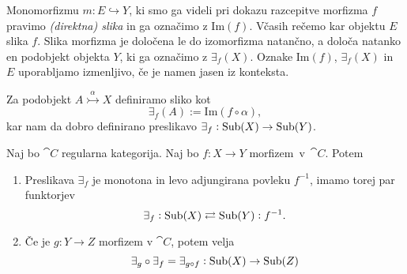 \documentclass[../kategoricna_logika.tex]{subfiles}
\begin{document}
\begin{definicija}
Monomorfizmu $m : E \hookrightarrow Y$, ki smo ga videli pri dokazu razcepitve morfizma $f$ pravimo \emph{(direktna) slika} in ga označimo z $\mathrm{Im}(f)$.
Včasih rečemo kar objektu $E$ slika $f$. Slika morfizma je določena le do izomorfizma natančno, a določa natanko en podobjekt objekta $Y$, ki ga označimo z $\exists_f(X)$.
Oznake $\mathrm{Im}(f)$, $\exists_f(X)$ in $E$ uporabljamo izmenljivo, če je namen jasen iz konteksta.

Za podobjekt $A \overset{\alpha}{\rightarrowtail} X$ definiramo sliko kot
$$\exists_f(A) := \mathrm{Im}(f \circ \alpha),$$
kar nam da dobro definirano preslikavo $\exists_f : \operatorname{Sub}(X) \to \operatorname{Sub}(Y)$.
\end{definicija}
\begin{comment}
Če se malo poigramo s temi slikami, dobimo diagram
\begin{equation*}
\begin{tikzcd}
  A \times_Y A \ar[d, shift left , "a_1"] \ar[d, shift right, "a_2"'] \ar[r, dashed, "u"] & X \times_Y X \ar[d, shift left, "p_1"] \ar[d, shift right, "p_2"'] & \\
  A \ar[d, two heads, "a"] \ar[r, tail, "\alpha"] & X \ar[dr, "f"] \ar[r, two heads, "q"] & \exists_f X \ar[d, tail, "m"] \\
  \exists_f A \ar[rr, tail] \ar[urr, dashed, "\dot{\imath}"] & & Y
\end{tikzcd}
\end{equation*}
iz katerega lahko zaradi enoličnosti slik (do izomorfizma natančno) razberemo, da je $\dot{\imath}$ monomorfizem.
\end{comment}
\begin{lema}
  Naj bo $\cat{C}$ regularna kategorija. Naj bo $f : X \to Y$ morfizem~v~$\cat{C}$. Potem
  \begin{enumerate}[label=(\roman*)]
    \item Preslikava $\exists_f$ je monotona in levo adjungirana povleku $f^{-1}$, imamo torej par funktorjev
    $$\exists_f : \operatorname{Sub}(X) \rightleftarrows \operatorname{Sub}(Y) : f^{-1}.$$
    \item Če je $g : Y \to Z$ morfizem v $\cat{C}$, potem velja $$\exists_g \circ \exists_f = \exists_{g \circ f} : \operatorname{Sub}(X) \to \operatorname{Sub}(Z)$$
  \end{enumerate}
\end{lema}
\end{document}
